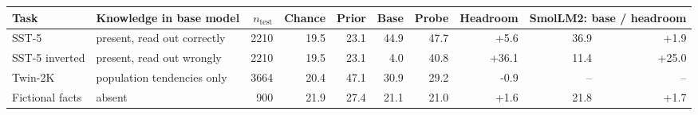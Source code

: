 \begin{tabular}{llrrrrrrrr}
\toprule
Task & Knowledge in base model & $n_\text{test}$ & Chance & Prior & Base & Probe & Headroom & \multicolumn{2}{c}{SmolLM2: base / headroom} \\
\midrule
SST-5 & present, read out correctly & 2210 & 19.5 & 23.1 & 44.9 & 47.7 & +5.6 & 36.9 & +1.9 \\
SST-5 inverted & present, read out wrongly & 2210 & 19.5 & 23.1 & 4.0 & 40.8 & +36.1 & 11.4 & +25.0 \\
Twin-2K & population tendencies only & 3664 & 20.4 & 47.1 & 30.9 & 29.2 & -0.9 & -- & -- \\
Fictional facts & absent & 900 & 21.9 & 27.4 & 21.1 & 21.0 & +1.6 & 21.8 & +1.7 \\
\bottomrule
\end{tabular}
